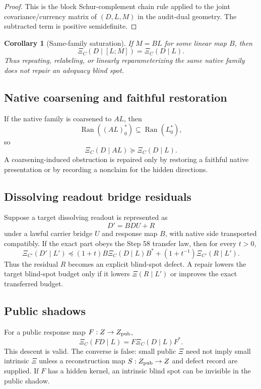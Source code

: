 \documentclass[11pt]{article}
\newtheorem{corollary}{Corollary}
\DeclareMathOperator{\Ran}{Ran}
\begin{document}
\begin{proof}
This is the block Schur-complement chain rule applied to the joint covariance/currency matrix of $(D,L,M)$ in the audit-dual geometry.  The subtracted term is positive semidefinite.
\end{proof}

\begin{corollary}[Same-family saturation]
If $M=BL$ for some linear map $B$, then
\[
\Xi_C(D\mid [L;M])=\Xi_C(D\mid L).
\]
Thus repeating, relabeling, or linearly reparameterizing the same native family does not repair an adequacy blind spot.
\end{corollary}

\subsection{Native coarsening and faithful restoration}
If the native family is coarsened to $AL$, then
\[
\Ran((AL)_0^*)\subseteq\Ran(L_0^*),
\]
so
\[
\boxed{\Xi_C(D\mid AL)\succeq\Xi_C(D\mid L).}
\]
A coarsening-induced obstruction is repaired only by restoring a faithful native presentation or by recording a nonclaim for the hidden directions.

\subsection{Dissolving readout bridge residuals}
Suppose a target dissolving readout is represented as
\[
D'=B D U+R
\]
under a lawful carrier bridge $U$ and response map $B$, with native side transported compatibly.  If the exact part obeys the Step 58 transfer law, then for every $t>0$,
\[
\boxed{
\Xi_{C'}(D'\mid L')
\preceq
(1+t)B\Xi_C(D\mid L)B^*+(1+t^{-1})\Xi_{C'}(R\mid L').
}
\]
Thus the residual $R$ becomes an explicit blind-spot defect.  A repair lowers the target blind-spot budget only if it lowers $\Xi(R\mid L')$ or improves the exact transferred budget.

\subsection{Public shadows}
For a public response map $F:Z\to Z_{\rm pub}$,
\[
\Xi_C(FD\mid L)=F\Xi_C(D\mid L)F^*.
\]
This descent is valid.  The converse is false: small public $\Xi$ need not imply small intrinsic $\Xi$ unless a reconstruction map $S:Z_{\rm pub}\to Z$ and defect record are supplied.  If $F$ has a hidden kernel, an intrinsic blind spot can be invisible in the public shadow.
\end{document}
